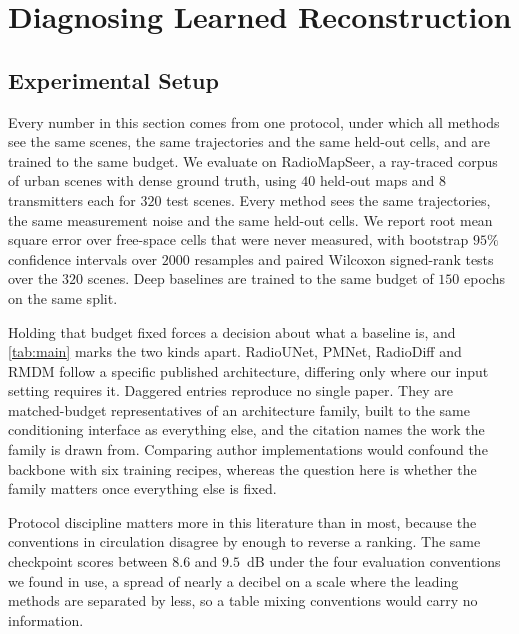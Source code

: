 \section{Diagnosing Learned Reconstruction}
\label{sec:experiments}

\subsection{Experimental Setup}

Every number in this section comes from one protocol, under which all methods see the
same scenes, the same trajectories and the same held-out cells, and are trained to
the same budget. We evaluate on RadioMapSeer, a ray-traced corpus of urban scenes with dense
ground truth, using $40$ held-out maps and $8$ transmitters each for $320$ test
scenes. Every method sees the same trajectories, the same measurement noise and the
same held-out cells. We report root mean square error over free-space cells that
were never measured, with bootstrap $95\%$ confidence intervals over $2000$
resamples and paired Wilcoxon signed-rank tests over the $320$ scenes. Deep
baselines are trained to the same budget of $150$ epochs on the same split.

Holding that budget fixed forces a decision about what a baseline is, and
\cref{tab:main} marks the two kinds apart. RadioUNet, PMNet, RadioDiff and RMDM
follow a specific published architecture, differing only where our input setting
requires it. Daggered entries reproduce no single paper. They are matched-budget
representatives of an architecture family, built to the same conditioning interface
as everything else, and the citation names the work the family is drawn from.
Comparing author implementations would confound the backbone with six training
recipes, whereas the question here is whether the family matters once everything
else is fixed.

Protocol discipline matters more in this literature than in most, because the
conventions in circulation disagree by enough to reverse a ranking. The same
checkpoint scores between $8.6$ and $9.5$~dB under the four evaluation conventions
we found in use, a spread of nearly a decibel on a scale where the leading methods
are separated by less, so a table mixing conventions would carry no information.

\begin{table}[t]
\centering\scriptsize
\setlength{\tabcolsep}{3pt}

\caption{\textbf{Free-space unobserved RMSE (dB) on $320$ held-out scenes},
with bootstrap $95\%$ intervals, structural similarity, and the error split by
line-of-sight visibility. Every method sees identical trajectories and identical
held-out cells. A dagger marks a matched-budget representative of an architecture
family rather than a reimplementation of the cited paper, as explained in
\cref{sec:experiments}. Adding one geometric channel to a single U-Net is worth more
than any architectural substitution in the panel.}
\label{tab:main}
\end{table}

